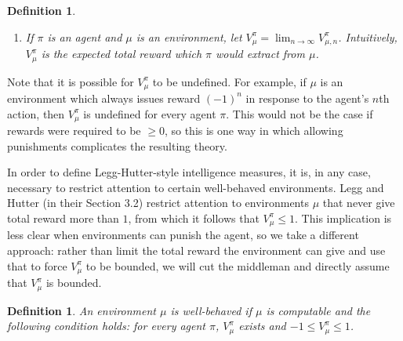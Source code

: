 \documentclass{article}
\newtheorem{definition}[theorem]{Definition}
\begin{document}
\begin{definition}
\begin{enumerate}
\begin{enumerate}
            measure $\pi(\bullet|o_0,r_0)$.
            \item
            For each $i>0$,
            $(o_i,r_i)\in\mathcal O\times\mathcal R$ is chosen randomly based on
            the probability measure
            $\mu(\bullet|o_0,r_0,a_0,\ldots,o_{i-1},r_{i-1},a_{i-1})$.
            \item
            For each $i>0$,
            $a_i\in\mathcal A$ is chosen randomly based on the probability measure
            $\pi(\bullet|o_0,r_0,a_0,\ldots,o_{i-1},r_{i-1},a_{i-1},o_i,r_i)$.
        \end{enumerate}
        \item
        If $\pi$ is an agent and $\mu$ is an environment,
        let $V^\pi_\mu=\lim_{n\to\infty}V^{\pi}_{\mu,n}$.
        Intuitively, $V^\pi_\mu$ is the expected total reward which $\pi$ would extract
        from $\mu$.
    \end{enumerate}
\end{definition}

Note that it is possible for $V^\pi_\mu$ to be undefined.
For example, if $\mu$ is an environment which always issues
reward $(-1)^n$ in response to the agent's $n$th action,
then $V^\pi_\mu$ is undefined for every agent $\pi$.
This would not be the case if rewards were required to be $\geq 0$,
so this is one way in which allowing
punishments complicates the resulting theory.

In order to define Legg-Hutter-style
intelligence measures, it is, in any case, necessary to restrict attention to
certain well-behaved environments. Legg and Hutter (in their Section 3.2)
restrict attention to environments $\mu$ that never give total reward more than $1$,
from which it follows that $V^\pi_\mu\leq 1$. This implication is less clear
when environments can punish the agent, so we take a different approach:
rather than limit the total reward the environment can give and use that to
force $V^\pi_\mu$ to be bounded, we will cut the middleman and
directly assume that $V^\pi_\mu$ is bounded.

\begin{definition}
    An environment $\mu$ is \emph{well-behaved} if $\mu$ is computable and the following
    condition holds: for every agent $\pi$, $V^\pi_\mu$ exists and
    $-1\leq V^\pi_\mu\leq 1$.
\end{definition}
\end{document}
